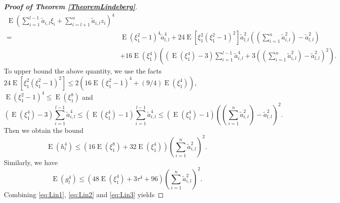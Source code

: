 \documentclass[11pt]{article}
\DeclareMathOperator{\myE}{E}
\theoremstyle{plain}
\theoremstyle{definition}
\theoremstyle{remark}
\begin{document}
\begin{proof}[\textbf{Proof of Theorem \ref{TheoremLindeberg}}]
\begin{equation*}
\begin{split}
        \myE \left( 
        \sum_{i=1}^{l-1} \tilde a_{i,l} \xi_i 
        +\sum_{i =l +1}^n \tilde a_{i,l} z_i 
    \right)^4
    \\
    =&
        \myE (\xi_1^2 - 1)^4 \tilde a_{l,l}^4
        + 24 \myE [ \xi_1^2(\xi_1^2 -1)^2]
        \tilde a_{l,l}^2
    \left((\sum_{i=1}^n \tilde a_{i,l}^2) - \tilde a_{l,l}^2\right)
        \\
        &+
        16 \myE (\xi_1^4 )
    \left(
        \left(\myE (\xi_1^4) - 3\right)\sum_{i=1}^{l-1} \tilde a_{i,l}^4 
        + 3 \left( (\sum_{i=1}^n \tilde a_{i,l}^2) - \tilde a_{l,l}^2 \right)^2
    \right)
    .
    \end{split}
\end{equation*}
To upper bound the above quantity, we use the facts
$
24 \myE [ \xi_1^2(\xi_1^2 -1)^2]
\leq 
2(16\myE (\xi_1^2 -1)^4 + (9/4) \myE  (\xi_1^4) )
$,
$\myE (\xi_1^2 - 1)^4\leq \myE (\xi_1^8)$ and
\begin{equation*}
        \left(\myE (\xi_1^4) - 3\right)\sum_{i=1}^{l-1} \tilde a_{i,l}^4 
        \leq
        \left(\myE (\xi_1^4) - 1\right)\sum_{i=1}^{l-1} \tilde a_{i,l}^4 
        \leq
        \left(\myE (\xi_1^4) - 1\right)
        \left( (\sum_{i=1}^n \tilde a_{i,l}^2) - \tilde a_{l,l}^2 \right)^2
        .
\end{equation*}
Then we obtain the bound 
\begin{equation}\label{eq:Lin2}
\myE (h_l^4) \leq \left(16 \myE (\xi_1^8) + 32 \myE (\xi_1^4)\right) \left(\sum_{i=1}^n \tilde a_{i,l}^2\right)^2.
\end{equation}
Similarly, we have
\begin{equation}\label{eq:Lin3}
\myE (g_l^4) \leq \left(  48 \myE (\xi_1^4) + 3\tau^4 + 96 \right) \left(\sum_{i=1}^n \tilde a_{i,l}^2\right)^2.
\end{equation}
Combining \eqref{eq:Lin1}, \eqref{eq:Lin2} and \eqref{eq:Lin3} yields


\end{proof}
\end{document}
